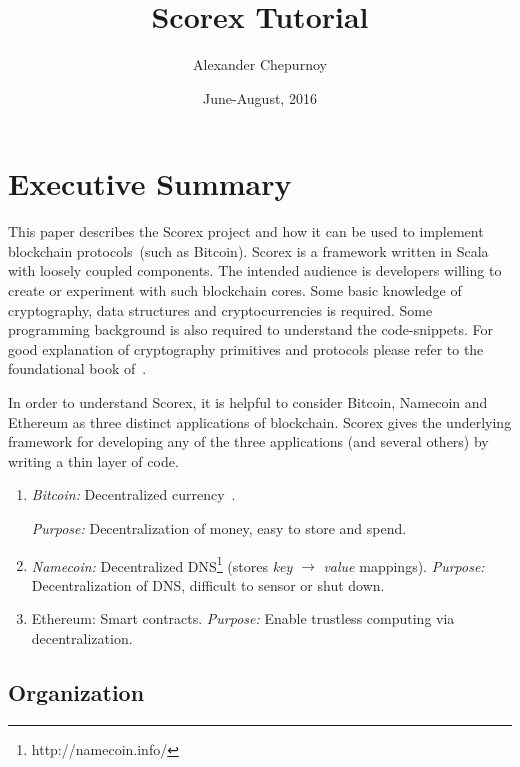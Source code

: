 \documentclass[]{report}   %
\begin{document}
%

\title{Scorex Tutorial}
\author{Alexander Chepurnoy}         
\date{June-August, 2016}
\maketitle

\chapter{Executive Summary}

This paper describes the Scorex project and how it can be used to implement blockchain protocols~(such as Bitcoin). Scorex is a framework written in Scala with loosely coupled components. 
The intended audience is developers willing to create or experiment with such blockchain cores. Some basic knowledge of cryptography, data structures and cryptocurrencies is required. Some programming background is also required to understand the code-snippets. For good explanation of cryptography primitives and protocols please refer to the foundational book of~\cite{katz2014introduction}. 

In order to understand Scorex, it is helpful to consider Bitcoin, Namecoin and Ethereum as three distinct applications of blockchain. Scorex gives the underlying framework for developing any of the three applications (and several others) by writing a thin layer of code. 

\begin{enumerate}
	\item {\em Bitcoin:} Decentralized currency~\cite{Nakamoto2008}.
	
		{\em Purpose:} Decentralization of money, easy to store and spend.		
	\item {\em Namecoin:} Decentralized DNS\footnote{http://namecoin.info/} (stores {\em key} $\rightarrow$ {\em value} mappings).
		{\em Purpose:} Decentralization of DNS, difficult to sensor or shut down.		
	\item {Ethereum:} Smart	contracts.	
	  {\em Purpose:} Enable trustless computing via decentralization.		
\end{enumerate}


\section{Organization}
\end{document}
